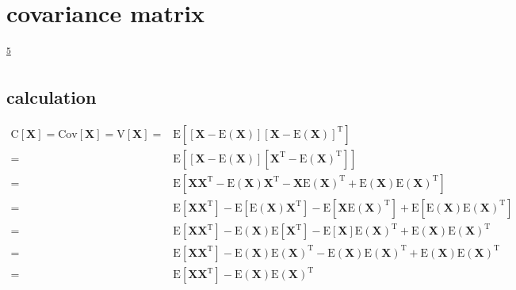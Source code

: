 \documentclass[
]{book}
\theoremstyle{definition}
\theoremstyle{definition}
\theoremstyle{definition}
\theoremstyle{definition}
\theoremstyle{remark}
\begin{document}
\hypertarget{covariance-matrix}{%
\section{covariance matrix}\label{covariance-matrix}}

\textsuperscript{\protect\hyperlink{ref-ccjou2014}{5}}

\hypertarget{calculation}{%
\subsection{calculation}\label{calculation}}

\begin{align*}
\mathrm{C}\left[\boldsymbol{X}\right]=\mathrm{Cov}\left[\boldsymbol{X}\right]=\mathrm{V}\left[\boldsymbol{X}\right]= & \mathrm{E}\left[\left[\boldsymbol{X}-\mathrm{E}\left(\boldsymbol{X}\right)\right]\left[\boldsymbol{X}-\mathrm{E}\left(\boldsymbol{X}\right)\right]^{\mathrm{T}}\right]\\
= & \mathrm{E}\left[\left[\boldsymbol{X}-\mathrm{E}\left(\boldsymbol{X}\right)\right]\left[\boldsymbol{X}^{\mathrm{T}}-\mathrm{E}\left(\boldsymbol{X}\right)^{\mathrm{T}}\right]\right]\\
= & \mathrm{E}\left[\boldsymbol{X}\boldsymbol{X}^{\mathrm{T}}-\mathrm{E}\left(\boldsymbol{X}\right)\boldsymbol{X}^{\mathrm{T}}-\boldsymbol{X}\mathrm{E}\left(\boldsymbol{X}\right)^{\mathrm{T}}+\mathrm{E}\left(\boldsymbol{X}\right)\mathrm{E}\left(\boldsymbol{X}\right)^{\mathrm{T}}\right]\\
= & \mathrm{E}\left[\boldsymbol{X}\boldsymbol{X}^{\mathrm{T}}\right]-\mathrm{E}\left[\mathrm{E}\left(\boldsymbol{X}\right)\boldsymbol{X}^{\mathrm{T}}\right]-\mathrm{E}\left[\boldsymbol{X}\mathrm{E}\left(\boldsymbol{X}\right)^{\mathrm{T}}\right]+\mathrm{E}\left[\mathrm{E}\left(\boldsymbol{X}\right)\mathrm{E}\left(\boldsymbol{X}\right)^{\mathrm{T}}\right]\\
= & \mathrm{E}\left[\boldsymbol{X}\boldsymbol{X}^{\mathrm{T}}\right]-\mathrm{E}\left(\boldsymbol{X}\right)\mathrm{E}\left[\boldsymbol{X}^{\mathrm{T}}\right]-\mathrm{E}\left[\boldsymbol{X}\right]\mathrm{E}\left(\boldsymbol{X}\right)^{\mathrm{T}}+\mathrm{E}\left(\boldsymbol{X}\right)\mathrm{E}\left(\boldsymbol{X}\right)^{\mathrm{T}}\\
= & \mathrm{E}\left[\boldsymbol{X}\boldsymbol{X}^{\mathrm{T}}\right]-\mathrm{E}\left(\boldsymbol{X}\right)\mathrm{E}\left(\boldsymbol{X}\right)^{\mathrm{T}}-\mathrm{E}\left(\boldsymbol{X}\right)\mathrm{E}\left(\boldsymbol{X}\right)^{\mathrm{T}}+\mathrm{E}\left(\boldsymbol{X}\right)\mathrm{E}\left(\boldsymbol{X}\right)^{\mathrm{T}}\\
= & \mathrm{E}\left[\boldsymbol{X}\boldsymbol{X}^{\mathrm{T}}\right]-\mathrm{E}\left(\boldsymbol{X}\right)\mathrm{E}\left(\boldsymbol{X}\right)^{\mathrm{T}}
\end{align*}
\end{document}

